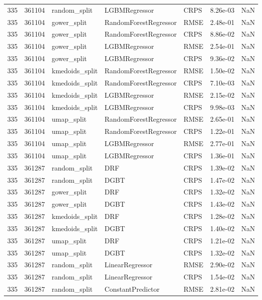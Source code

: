 \begin{tabular}{rrlllrr}
335 & 361104 & random\_split & LGBMRegressor & CRPS & 8.26e-03 & NaN \\
335 & 361104 & gower\_split & RandomForestRegressor & RMSE & 2.48e-01 & NaN \\
335 & 361104 & gower\_split & RandomForestRegressor & CRPS & 8.86e-02 & NaN \\
335 & 361104 & gower\_split & LGBMRegressor & RMSE & 2.54e-01 & NaN \\
335 & 361104 & gower\_split & LGBMRegressor & CRPS & 9.36e-02 & NaN \\
335 & 361104 & kmedoids\_split & RandomForestRegressor & RMSE & 1.50e-02 & NaN \\
335 & 361104 & kmedoids\_split & RandomForestRegressor & CRPS & 7.10e-03 & NaN \\
335 & 361104 & kmedoids\_split & LGBMRegressor & RMSE & 2.15e-02 & NaN \\
335 & 361104 & kmedoids\_split & LGBMRegressor & CRPS & 9.98e-03 & NaN \\
335 & 361104 & umap\_split & RandomForestRegressor & RMSE & 2.65e-01 & NaN \\
335 & 361104 & umap\_split & RandomForestRegressor & CRPS & 1.22e-01 & NaN \\
335 & 361104 & umap\_split & LGBMRegressor & RMSE & 2.77e-01 & NaN \\
335 & 361104 & umap\_split & LGBMRegressor & CRPS & 1.36e-01 & NaN \\
335 & 361287 & random\_split & DRF & CRPS & 1.39e-02 & NaN \\
335 & 361287 & random\_split & DGBT & CRPS & 1.47e-02 & NaN \\
335 & 361287 & gower\_split & DRF & CRPS & 1.32e-02 & NaN \\
335 & 361287 & gower\_split & DGBT & CRPS & 1.43e-02 & NaN \\
335 & 361287 & kmedoids\_split & DRF & CRPS & 1.28e-02 & NaN \\
335 & 361287 & kmedoids\_split & DGBT & CRPS & 1.40e-02 & NaN \\
335 & 361287 & umap\_split & DRF & CRPS & 1.21e-02 & NaN \\
335 & 361287 & umap\_split & DGBT & CRPS & 1.32e-02 & NaN \\
335 & 361287 & random\_split & LinearRegressor & RMSE & 2.90e-02 & NaN \\
335 & 361287 & random\_split & LinearRegressor & CRPS & 1.54e-02 & NaN \\
335 & 361287 & random\_split & ConstantPredictor & RMSE & 2.81e-02 & NaN \\

\end{tabular}
